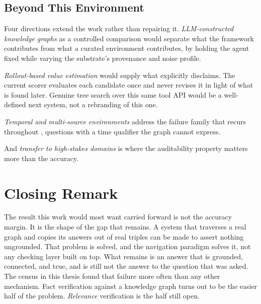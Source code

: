 \subsection{Beyond This Environment}

Four directions extend the work rather than repairing it. \emph{LLM-constructed
knowledge graphs} as a controlled comparison would separate what the framework
contributes from what a curated environment contributes, by holding the agent
fixed while varying the substrate's provenance and noise profile.

\emph{Rollout-based value estimation} would supply what
 explicitly disclaims. The current scorer evaluates
each candidate once and never revises it in light of what is found later.
Genuine tree search over this same tool API would be a well-defined next system,
not a rebranding of this one.

\emph{Temporal and multi-source environments} address the failure family that
recurs throughout , questions with a time qualifier the
graph cannot express.

And \emph{transfer to high-stakes domains} is where the auditability property
matters more than the accuracy.

\section{Closing Remark}

The result this work would most want carried forward is not the accuracy margin.
It is the shape of the gap that remains. A system that traverses a real graph
and copies its answers out of real triples can be made to assert nothing
ungrounded. That problem is solved, and the navigation paradigm solves it, not
any checking layer built on top. What remains is an answer that is grounded,
connected, and true, and is still not the answer to the question that was asked.
The census in this thesis found that failure more often than any other
mechanism. Fact verification against a knowledge graph turns out to be the
easier half of the problem. \emph{Relevance} verification is the half still
open.

\endinput
